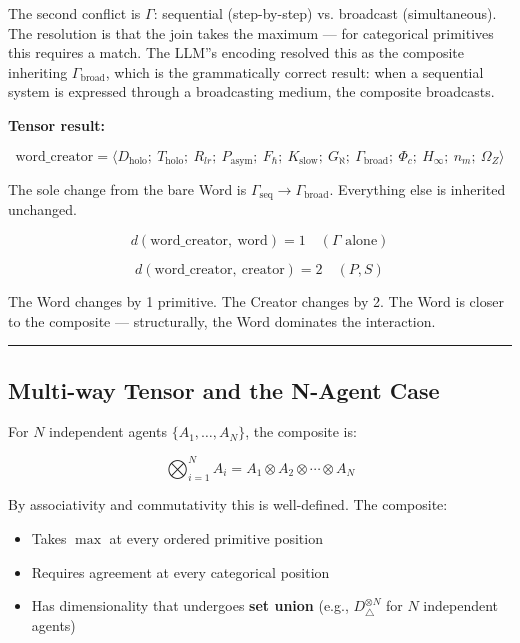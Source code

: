 \documentclass[11pt,a4paper]{article}
\begin{document}
The second conflict is $\Gamma$: sequential (step-by-step) vs. broadcast (simultaneous). The resolution is that the join takes the maximum --- for categorical primitives this requires a match. The LLM''s encoding resolved this as the composite inheriting $\Gamma_\text{broad}$, which is the grammatically correct result: when a sequential system is expressed through a broadcasting medium, the composite broadcasts.

\textbf{Tensor result:}


\[\text{word\_creator} = \langle D_\text{holo};\ T_\text{holo};\ R_{lr};\ P_\text{asym};\ F_{\hbar};\ K_\text{slow};\ G_{\aleph};\ \Gamma_\text{broad};\ \Phi_c;\ H_{\infty};\ n_m;\ \Omega_Z \rangle\]

The sole change from the bare Word is $\Gamma_\text{seq} \to \Gamma_\text{broad}$. Everything else is inherited unchanged.

\[d(\text{word\_creator},\ \text{word}) = 1 \quad (\Gamma \text{ alone})\]




\[d(\text{word\_creator},\ \text{creator}) = 2 \quad (P, S)\]

The Word changes by 1 primitive. The Creator changes by 2. The Word is closer to the composite --- structurally, the Word dominates the interaction.

\begin{center}
\rule{0.5\textwidth}{0.4pt}
\end{center}

\subsection{Multi-way Tensor and the N-Agent Case}

For $N$ independent agents $\{A_1, \ldots, A_N\}$, the composite is:

\[\bigotimes_{i=1}^{N} A_i = A_1 \otimes A_2 \otimes \cdots \otimes A_N\]

By associativity and commutativity this is well-defined. The composite:

\begin{itemize}
    \item Takes $\max$ at every ordered primitive position
    \item Requires agreement at every categorical position
    \item Has dimensionality that undergoes \textbf{set union} (e.g., $D_{\triangle}^{\otimes N}$ for $N$ independent agents)
\end{itemize}
\end{document}
